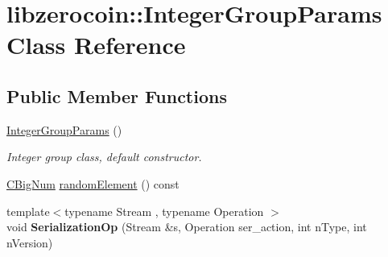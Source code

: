 \hypertarget{classlibzerocoin_1_1_integer_group_params}{}\section{libzerocoin\+::Integer\+Group\+Params Class Reference}
\label{classlibzerocoin_1_1_integer_group_params}
\subsection*{Public Member Functions}
\begin{DoxyCompactItemize}
\item 
\mbox{\hyperlink{classlibzerocoin_1_1_integer_group_params_ae37d4d4e9c525069a15155e454d7f48e}{Integer\+Group\+Params}} ()
\begin{DoxyCompactList}\small\item\em Integer group class, default constructor. \end{DoxyCompactList}\item 
\mbox{\hyperlink{class_c_big_num}{C\+Big\+Num}} \mbox{\hyperlink{classlibzerocoin_1_1_integer_group_params_a012079a03d0aeacc42fe005ed7c0ab62}{random\+Element}} () const
\item 
\mbox{\label{classlibzerocoin_1_1_integer_group_params_a3341e72981d4e7551c7d8fe26f615848}} 
{\footnotesize template$<$typename Stream , typename Operation $>$ }\\void {\bfseries Serialization\+Op} (Stream \&s, Operation ser\+\_\+action, int n\+Type, int n\+Version)
\end{DoxyCompactItemize}
